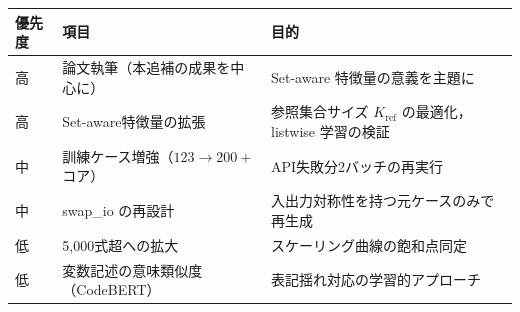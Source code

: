 \documentclass[11pt,a4paper]{ltjsarticle}
\begin{document}
\begin{table}[h]
\centering
\begin{tabular}{lll}
\toprule
優先度 & 項目 & 目的 \\
\midrule
高 & 論文執筆（本追補の成果を中心に） & Set-aware 特徴量の意義を主題に \\
高 & Set-aware特徴量の拡張 & 参照集合サイズ $K_{\mathrm{ref}}$ の最適化，listwise 学習の検証 \\
中 & 訓練ケース増強（$123 \to 200+$コア） & API失敗分2バッチの再実行 \\
中 & swap\_io の再設計 & 入出力対称性を持つ元ケースのみで再生成 \\
低 & 5{,}000式超への拡大 & スケーリング曲線の飽和点同定 \\
低 & 変数記述の意味類似度（CodeBERT） & 表記揺れ対応の学習的アプローチ \\
\bottomrule
\end{tabular}
\end{table}
\end{document}
